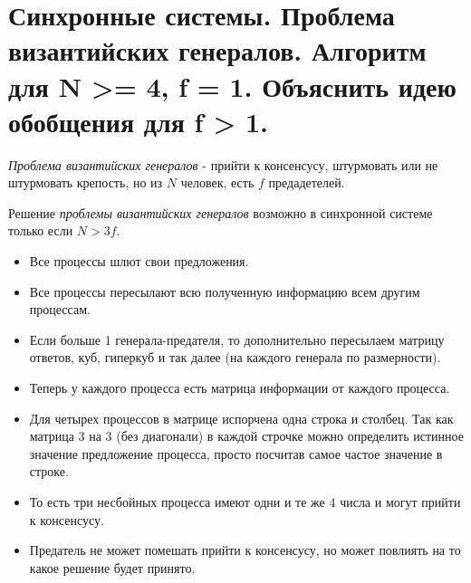 \section{Синхронные системы. Проблема византийских генералов. Алгоритм для N >= 4, f = 1. Объяснить идею обобщения для f > 1.}

\begin{definition}
    \textit{Проблема византийских генералов} - прийти к консенсусу, штурмовать
    или не штурмовать крепость, но из $N$ человек, есть $f$ предадетелей.
\end{definition}

\begin{theorem}
    Решение \textit{проблемы византийских генералов} возможно в синхронной системе только если $N > 3f$.
\end{theorem}

\begin{algorithm}
    \enewline
    \begin{itemize}
        \item Все процессы шлют свои предложения.
        \item Все процессы пересылают всю полученную информацию всем другим процессам.
        \item Если больше 1 генерала-предателя, то дополнительно пересылаем матрицу ответов, куб,
            гиперкуб и так далее (на каждого генерала по размерности).
        \item Теперь у каждого процесса есть матрица информации от каждого процесса.
        \item Для четырех процессов в матрице испорчена одна строка и столбец.
            Так как матрица 3 на 3 (без диагонали) в каждой строчке можно определить истинное
            значение предложение процесса, просто посчитав самое частое значение в строке.
        \item То есть три несбойных процесса имеют одни и те же 4 числа и могут прийти к консенсусу.
        \item Предатель не может помешать прийти к консенсусу, но может повлиять на то какое решение будет принято.
    \end{itemize}
\end{algorithm}
